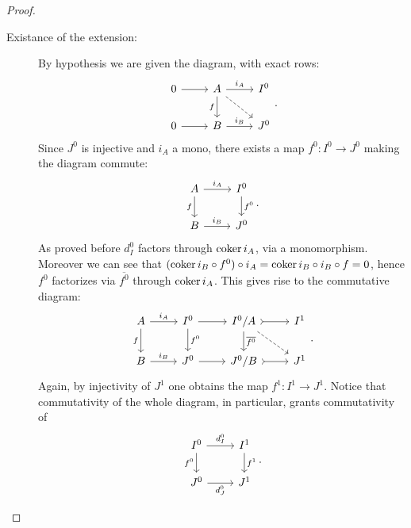 \documentclass[../Main]{subfiles}
\begin{document}
\begin{proof}
\begin{description}
		\item[Existance of the extension:]
			By hypothesis we are given the diagram, with exact rows:
	\begin{equation}
	\begin{tikzcd}
		0 \arrow[r, "", rightarrow] &
		A \arrow[r, "i_A", rightarrow] 
		\arrow[d, "f"', rightarrow] \arrow[rd, "", dashrightarrow] &
		I^0\\
		0 \arrow[r, "", rightarrow] &
		B \arrow[r, "i_B", rightarrow] &
		J^0
	\end{tikzcd}
	.\end{equation} 
	Since $J^0$ is injective and $i_A$ a mono, there exists a map
	$f^0\colon I^0 \to J^0$ making the diagram commute:
	\begin{equation}
	\begin{tikzcd}
		A \arrow[r, "i_A", rightarrow] 
		\arrow[d, "f"', rightarrow] &
		I^0 \arrow[d, "f^0", rightarrow] \\
		B \arrow[r, "i_B", rightarrow] &
		J^0
	\end{tikzcd}
	.\end{equation} 
	As proved before $d^0_I$ factors through $\operatorname{coker} i_A$, via a monomorphism.
	Moreover we can see that $(\operatorname{coker} i_B \circ f^0) \circ i_A = \operatorname{coker} i_B \circ i_B \circ f = 0$,
	hence $f^0$ factorizes via $\overline{f^0}$ through $\operatorname{coker} i_A$.
	This gives rise to the commutative diagram:
	\begin{equation}
	\begin{tikzcd}
		A \arrow[r, "i_A", rightarrow] 
		\arrow[d, "f"', rightarrow] &
		I^0 \arrow[d, "f^0", rightarrow] 
		\arrow[r, "", rightarrow] &
		I^0/A \arrow[r, "", rightarrowtail] \arrow[d, "\overline{f^0}", rightarrow] 
		\arrow[rd, "", dashrightarrow] &
		I^1 \\
		B \arrow[r, "i_B", rightarrow] &
		J^0 \arrow[r, "", rightarrow] &
		J^0/B \arrow[r, "", rightarrowtail] &
		J^1
	\end{tikzcd}
	.\end{equation} 
	Again, by injectivity of $J^1$ one obtains the map
	$f^1\colon I^1 \to J^1$.
	Notice that commutativity of the whole diagram, in particular, grants commutativity of
	\begin{equation}
	\begin{tikzcd}
		I^0 \arrow[r, "d^0_I", rightarrow] \arrow[d, "f^0"', rightarrow] &
		I^1 \arrow[d, "f^1", rightarrow] \\
		J^0 \arrow[r, "d^0_J"', rightarrow] &
		J^1
	\end{tikzcd}
	.\end{equation} 

\end{description}
\end{proof}
\end{document}
